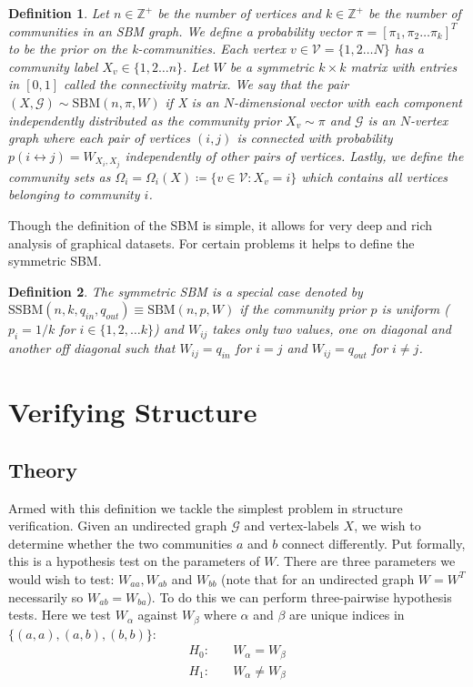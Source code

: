 \documentclass[]{article}
\newcommand{\Gcal}{\mathcal{G}}
\newcommand{\Vcal}{\mathcal{V}}
\newcommand{\Integers}{\mathbb{Z}}
\newtheorem{definition}{Definition}[section]
\begin{document}
\begin{definition}
	\label{defn:sbm}
	Let $n \in \Integers^+$ be the number of vertices and $k \in \Integers^+$ be the number of communities in an SBM graph. We define a probability vector $\pi = [\pi_1, \pi_2 \dots \pi_k]^T$ to be the prior on the k-communities. Each vertex $v \in \Vcal = \{1, 2 \dots N\}$ has a community label $X_v \in \{1, 2 \dots n\}$. Let $W$ be a symmetric $k \times k$ matrix with entries in $[0,1]$ called the connectivity matrix. We say that the pair $(X, \Gcal) \sim \textrm{SBM}(n, \pi, W)$ if X is an $N$-dimensional vector with each component independently distributed as the community prior $X_v \sim \pi$ and $\Gcal$ is an $N$-vertex graph where each pair of vertices $(i, j)$ is connected with probability $p(i \leftrightarrow j) = W_{X_i, X_j}$ independently of other pairs of vertices. Lastly, we define the community sets as $\Omega_i = \Omega_i(X) \coloneqq \{v \in \Vcal : X_v = i\}$ which contains all vertices belonging to community $i$.
\end{definition}

Though the definition of the SBM is simple, it allows for very deep and rich analysis of graphical datasets. For certain problems it helps to define the symmetric SBM.

\begin{definition}
	\label{defn:sym-sbm}
	The symmetric SBM is a special case denoted by $\textrm{SSBM}(n, k, q_{in}, q_{out}) \equiv \textrm{SBM}(n, p, W)$ if the community prior $p$ is uniform ($p_i = 1/k$ for $i \in \{1, 2, \dots k\}$) and $W_{ij}$ takes only two values, one on diagonal and another off diagonal such that $W_{ij} = q_{in}$ for $i=j$ and $W_{ij} = q_{out}$ for $i \neq j$.
\end{definition}

\section{Verifying Structure}
\subsection{Theory}

Armed with this definition we tackle the simplest problem in structure verification. Given an undirected graph $\Gcal$ and vertex-labels $X$, we wish to determine whether the two communities $a$ and $b$ connect differently. Put formally, this is a hypothesis test on the parameters of $W$. There are three parameters we would wish to test: $W_{aa}, W_{ab}$ and $W_{bb}$ (note that for an undirected graph $W = W^T$ necessarily so $W_{ab} = W_{ba}$). To do this we can perform three-pairwise hypothesis tests. Here we test $W_{\alpha}$ against $W_{\beta}$ where $\alpha$ and $\beta$ are unique indices in $\{(a,a), (a, b), (b,b)\}$:
%
\begin{equation}
\begin{aligned}
	H_0:& \quad W_{\alpha} = W_{\beta} \\
	H_1:& \quad W_{\alpha} \neq W_{\beta}
\end{aligned}
\end{equation}
\end{document}
